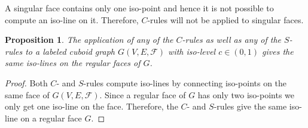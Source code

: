 \documentclass[a4paper,11pt]{article}
\newtheorem{proposition}[theorem]{Proposition}
\begin{document}
\FloatBarrier
{}A singular face contains only one iso-point and hence it is not possible
to compute an iso-line on it. Therefore, $C$-rules will not be applied to singular faces.
\begin{proposition}
The application of any of the  $C$-rules as well as any of the $S$-rules to a labeled cuboid
graph $G(V,E,\mathcal{F})$ with iso-level $c\in (0,1)$ gives the same iso-lines on the
regular faces of $G$.
\label{prop:iso-path-2}
\end{proposition}
\begin{proof}
Both $C$- and $S$-rules compute iso-lines by connecting iso-points on the same
face of $G(V,E,\mathcal{F})$. Since a regular face of $G$ has only two iso-points
we only get one iso-line on the face. Therefore, the $C$- and $S$-rules give the same
iso-line on a regular face $G$.
\end{proof}
\end{document}
